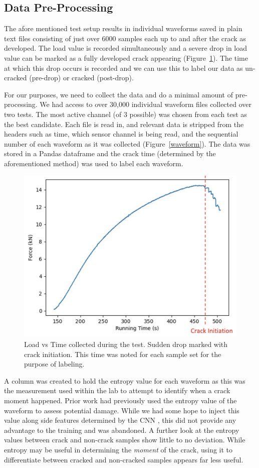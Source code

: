 \documentclass[conference]{IEEEtran}
\begin{document}
\subsection{Data Pre-Processing}

The afore mentioned test setup results in individual waveforms saved in plain text files consisting of just over 6000 samples each up to and after the crack as developed. The load value is recorded simultaneously and a severe drop in load value can be marked as a fully developed crack appearing (Figure~\ref{load_chart}). The time at which this drop occurs is recorded and we can use this to label our data as un-cracked (pre-drop) or cracked (post-drop).

For our purposes, we need to collect the data and do a minimal amount of pre-processing. We had access to over 30,000 individual waveform files collected over two tests. The most active channel (of 3 possible) was chosen from each test as the best candidate. Each file is read in, and relevant data is stripped from the headers such as time, which sensor channel is being read, and the sequential number of each waveform as it was collected (Figure~\ref{waveform}). The data was stored in a Pandas dataframe and the crack time (determined by the aforementioned method) was used to label each waveform. \\

\begin{figure}[htbp]
\centerline{\includegraphics[width=.5\textwidth]{images/force_chart.png}}
\caption{Load vs Time collected during the test. Sudden drop marked with crack initiation. This time was noted for each sample set for the purpose of labeling.}
\label{load_chart}
\end{figure}

A column was created to hold the entropy value for each waveform as this was the measurement used within the lab to attempt to identify when a crack moment happened. Prior work \cite{b1} had previously used the entropy value of the waveform to assess potential damage. While we had some hope to inject this value along side features determined by the CNN \cite{b4}, this did not provide any advantage to the training and was abandoned. A further look at the entropy values between crack and non-crack samples show little to no deviation. While entropy may be useful in determining the \emph{moment} of the crack, using it to differentiate between cracked and non-cracked samples appears far less useful.
\end{document}
